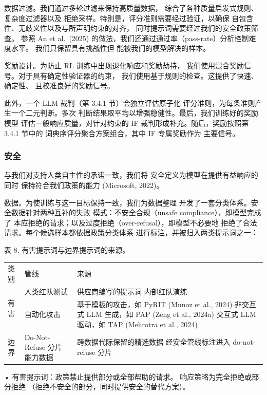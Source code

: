 \documentclass[
  10
]{article}
\newcounter{none} %
\begin{document}
数据过滤。我们通过多轮过滤来保持高质量数据，
综合了各种质量启发式规则、复杂度过滤器以及
拒绝采样。特别是，评分准则需要经过验证，以确保
自包含性、无歧义性以及与所声明约束的对齐，
同时提示词需要经过我们的安全政策筛查。
参照 An et al.~(2025) 的做法，我们还通过通过率（pass-rate）分析控制难度水平。
我们只保留具有挑战性但
能被我们的模型解决的样本。

奖励设计。为防止 RL 训练中出现退化响应和奖励劫持，
我们使用混合奖励信号。对于具有确定性验证器的约束，
我们使用基于规则的检查。这提供了快速、确定性、
且校准良好的奖励信号。

此外，一个 LLM 裁判（第 3.4.1 节）会独立评估原子化
评分准则，为每条准则产生一个二元判断。多次
判断结果取平均以增强稳健性。最后，我们训练好的奖励模型
评估一般响应质量，对针对约束的
IF 裁判形成补充。随后，奖励按照第 3.4.1 节中的
词典序评分聚合方案组合，其中 IF 专属奖励作为
主要信号。

\subsubsection{安全}\label{safety}

与我们对支持人类自主性的承诺一致，我们将
安全定义为模型在提供有益响应的同时
保持符合我们政策的能力 (Microsoft, 2022)。

数据。为使训练与这一目标保持一致，我们为数据整理
开发了一套分类体系。安全数据针对两种互补的失败
模式：不安全合规（unsafe compliance），即模型完成了
本应拒绝的请求；以及过度拒绝（over-refusal），即模型不必要地
拒绝了合法请求。每个候选样本都依据政策分类体系
进行标注，并被归入两类提示词之一：



表 8. 有害提示词与边界提示词的来源。

{\def\LTcaptype{none} %
\begin{longtable}[]{@{}lll@{}}
\toprule\noalign{}
\endhead
\bottomrule\noalign{}
\endlastfoot
类别 & 管线 & 来源 \\
\multirow{2}{*}{有害} & 人类红队测试 & 供应商编写的提示词
内部红队演练 \\
& 自动化攻击 & 基于模板的攻击，如 PyRIT (Munoz et al.,
2024) 非交互式 LLM 生成，如 PAP (Zeng et al., 2024a)
交互式 LLM 驱动，如 TAP (Mehrotra et al., 2024) \\
边界 & Do-Not-Refuse 分片 能力数据 & 跨数据代际保留的精选数据
经安全管线标注进入 do-not-refuse 分片 \\
\end{longtable}
}

• 有害提示词：政策禁止提供部分或全部帮助的请求。
响应策略为完全拒绝或部分拒绝
（拒绝不安全的部分，同时提供安全的替代方案）。
\end{document}
